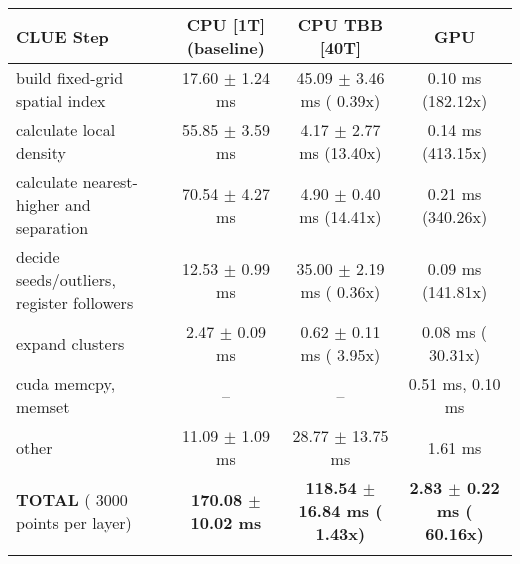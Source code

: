     \begin{tabular}{l|c|c|c}
    \hline
    CLUE Step                                 & CPU [1T] (baseline)         & CPU TBB [40T]                         & GPU                       \\ \hline
    build fixed-grid spatial index            &  17.60 $\pm$  1.24 ms       &  45.09 $\pm$  3.46 ms ( 0.39x)        &   0.10 ms (182.12x)       \\
    calculate local density                   &  55.85 $\pm$  3.59 ms       &   4.17 $\pm$  2.77 ms (13.40x)        &   0.14 ms (413.15x)       \\
    calculate nearest-higher and separation   &  70.54 $\pm$  4.27 ms       &   4.90 $\pm$  0.40 ms (14.41x)        &   0.21 ms (340.26x)       \\
    decide seeds/outliers, register followers &  12.53 $\pm$  0.99 ms       &  35.00 $\pm$  2.19 ms ( 0.36x)        &   0.09 ms (141.81x)       \\
    expand clusters                           &   2.47 $\pm$  0.09 ms       &   0.62 $\pm$  0.11 ms ( 3.95x)        &   0.08 ms ( 30.31x)       \\ \hline
    cuda memcpy, memset                       & --                          & --                                    &   0.51 ms,   0.10 ms      \\ 
    other                                     &  11.09 $\pm$  1.09 ms       &  28.77 $\pm$ 13.75 ms                 &   1.61 ms                 \\ \hline
    \textbf{TOTAL} ( 3000 points per layer)   & \textbf{170.08 $\pm$ 10.02 ms} & \textbf{118.54 $\pm$ 16.84 ms ( 1.43x)} & \textbf{  2.83 $\pm$  0.22 ms ( 60.16x)}  \\
    \hline
    \multicolumn{4}{c}{} 
    \end{tabular}
    \linebreak


